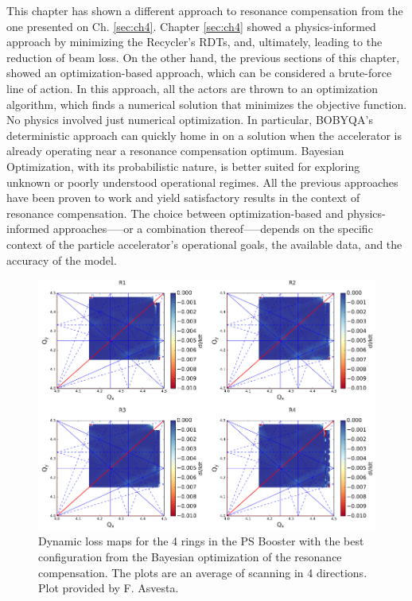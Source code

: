 This chapter has shown a different approach to resonance compensation from the one presented on Ch. \ref{sec:ch4}. Chapter \ref{sec:ch4} showed a physics-informed approach by minimizing the Recycler's RDTs, and, ultimately, leading to the reduction of beam loss. On the other hand, the previous sections of this chapter, showed an optimization-based approach, which can be considered a brute-force line of action. In this approach, all the actors are thrown to an optimization algorithm, which finds a numerical solution that minimizes the objective function. No physics involved just numerical optimization. In particular, BOBYQA's deterministic approach can quickly home in on a solution when the accelerator is already operating near a resonance compensation optimum. Bayesian Optimization, with its probabilistic nature, is better suited for exploring unknown or poorly understood operational regimes. All the previous approaches have been proven to work and yield satisfactory results in the context of resonance compensation. The choice between optimization-based and physics-informed approaches—--or a combination thereof—--depends on the specific context of the particle accelerator's operational goals, the available data, and the accuracy of the model.

\begin{figure}[H]
    \centering
    \includegraphics[width=\columnwidth]{chapter5/bocomp.png}
    \caption{Dynamic loss maps for the 4 rings in the PS Booster with the best configuration from the Bayesian optimization of the resonance compensation. The plots are an average of scanning in 4 directions. Plot provided by F. Asvesta.}
    \label{fig:bocomp_psb}
\end{figure}
